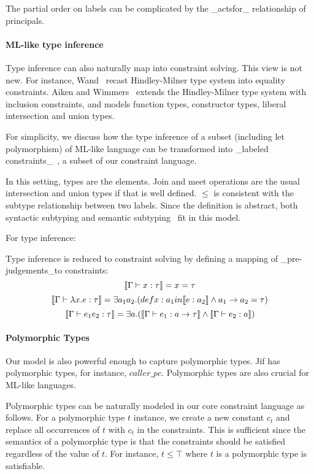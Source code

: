 The partial order on labels can be complicated by the _actsfor_ relationship of
principals.

 
\paragraph{ML-like type inference}

Type inference can also naturally map into constraint solving. This
view is not new. For instance, Wand~\cite{wand-typeinference} recast
Hindley-Milner type system into equality constraints. Aiken and
Wimmers~\cite{aiken-typeinclusion} extends the Hindley-Milner type
system with inclusion constraints, and models function types,
constructor types, liberal intersection and union types. 

For simplicity, we discuss how the type inference of a subset
(including let polymorphism) of ML-like language can be transformed
into _labeled constraints_~\cite{haack:slicing}, a subset of our
constraint language.

In this setting, types are the elements. Join and
meet operations are the usual intersection and union types if that is
well defined.
$\leq$ is consistent with the subtype relationship between two labels.
Since the definition is abstract, both syntactic subtyping 
and semantic subtyping~\cite{aiken-typeinclusion} fit in this model.

For type inference:

Type inference is reduced to constraint solving by defining a mapping
of _pre-judgements_to constraints:
\[\llbracket \Gamma \vdash x:\tau \rrbracket = x =\tau\]
\[\llbracket \Gamma \vdash \lambda x.e:\tau \rrbracket = \exists a_1 a_2.
(def x: a_1 in \llbracket e:a_2 \rrbracket \land a_1 \rightarrow a_2 =\tau)\]
\[\llbracket \Gamma\vdash e_1 e_2 : \tau \rrbracket = \exists a.(\llbracket \Gamma \vdash
e_1:a\rightarrow \tau \rrbracket\land \llbracket \Gamma\vdash e_2:a \rrbracket)\]


\paragraph{Polymorphic Types}

Our model is also powerful enough to capture polymorphic types.  Jif
has polymorphic types, for instance, $caller\_pc$. Polymorphic types
are also crucial for ML-like languages.

Polymorphic types can be naturally modeled in our core constraint
language as follows. For a polymorphic type $t$ instance, we create a
new constant $c_t$ and replace all occurrences of $t$ with $c_t$ in
the constraints. This is sufficient since the semantics of a
polymorphic type is that the constraints should be satisfied
regardless of the value of $t$. For instance, $t\leq \top$ where $t$
is a polymorphic type is satisfiable.

